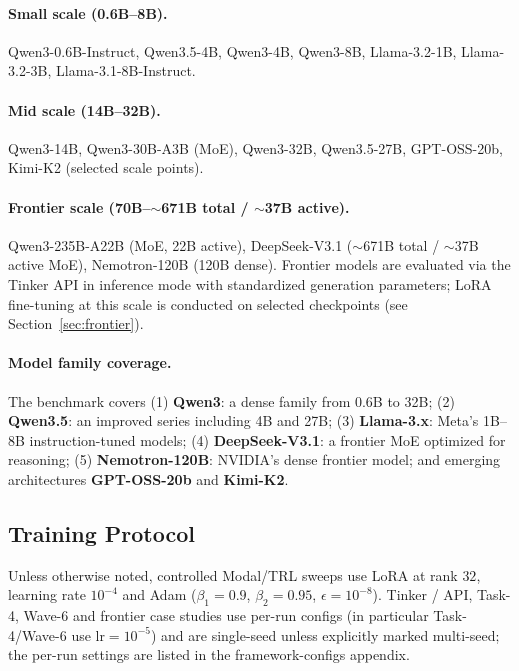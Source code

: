 \documentclass{article}
\begin{document}
\paragraph{Small scale (0.6B--8B).}
Qwen3-0.6B-Instruct, Qwen3.5-4B, Qwen3-4B, Qwen3-8B,
Llama-3.2-1B, Llama-3.2-3B, Llama-3.1-8B-Instruct.

\paragraph{Mid scale (14B--32B).}
Qwen3-14B, Qwen3-30B-A3B (MoE), Qwen3-32B, Qwen3.5-27B,
GPT-OSS-20b, Kimi-K2 (selected scale points).

\paragraph{Frontier scale (70B--$\sim$671B total / $\sim$37B active).}
Qwen3-235B-A22B (MoE, 22B active), DeepSeek-V3.1 ($\sim$671B total /
$\sim$37B active MoE), Nemotron-120B (120B dense).
Frontier models are evaluated via the Tinker API in inference mode
with standardized generation parameters; LoRA fine-tuning at this
scale is conducted on selected checkpoints (see Section~\ref{sec:frontier}).

\paragraph{Model family coverage.}
The benchmark covers (1) \textbf{Qwen3}: a dense family from 0.6B to 32B;
(2) \textbf{Qwen3.5}: an improved series including 4B and 27B;
(3) \textbf{Llama-3.x}: Meta's 1B--8B instruction-tuned models;
(4) \textbf{DeepSeek-V3.1}: a frontier MoE optimized for reasoning;
(5) \textbf{Nemotron-120B}: NVIDIA's dense frontier model;
and emerging architectures \textbf{GPT-OSS-20b} and \textbf{Kimi-K2}.

\subsection{Training Protocol}

Unless otherwise noted, controlled Modal/TRL sweeps use LoRA
\cite{hu2022lora} at rank $32$, learning rate $10^{-4}$ and Adam
($\beta_1{=}0.9$, $\beta_2{=}0.95$, $\epsilon{=}10^{-8}$). Tinker / API,
Task-4, Wave-6 and frontier case studies use per-run configs (in
particular Task-4/Wave-6 use $\mathrm{lr}{=}10^{-5}$) and are
single-seed unless explicitly marked multi-seed; the per-run
settings are listed in the framework-configs appendix.
\end{document}
